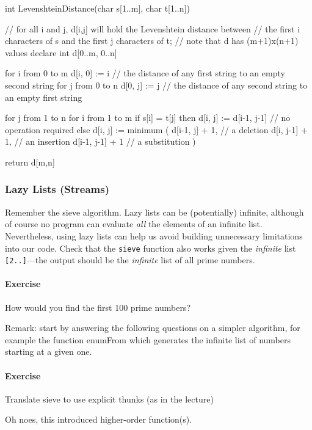 \documentclass{article}
\newcommand{\percents}[1]{\protect \marginpar[l]{\bf [#1]}}
\newcounter{question}
\newcommand{\question}[1]{
  \addtocounter{question}{1}
  \paragraph{Exercise~\arabic{question}  \percents{#1}}
 }
\newenvironment{ex}[1]{\question{#1}}{\vspace{1em}}
\newcommand{\answer}[1]{}
\newcommand{\correctedLastYear}[1]{}
\begin{document}
\begin{cplus}
int LevenshteinDistance(char s[1..m], char t[1..n])
{
  // for all i and j, d[i,j] will hold the Levenshtein distance between
  // the first i characters of s and the first j characters of t;
  // note that d has (m+1)x(n+1) values
  declare int d[0..m, 0..n]

  for i from 0 to m
    d[i, 0] := i // the distance of any first string to an empty second string
  for j from 0 to n
    d[0, j] := j // the distance of any second string to an empty first string

  for j from 1 to n
  {
    for i from 1 to m
    {
      if s[i] = t[j] then
        d[i, j] := d[i-1, j-1]       // no operation required
      else
        d[i, j] := minimum
                   (
                     d[i-1, j] + 1,  // a deletion
                     d[i, j-1] + 1,  // an insertion
                     d[i-1, j-1] + 1 // a substitution
                   )
    }
  }

  return d[m,n]
}
\end{cplus}

\answer{
See Diff.hs
}

\subsubsection{Lazy Lists (Streams)}

Remember the sieve algorithm. Lazy lists can be (potentially)
infinite, although of course no program can evaluate {\em all} the
elements of an infinite list. Nevertheless, using lazy lists can help
us avoid building unnecessary limitations into our code.  Check that
the \verb!sieve! function also works given the {\em infinite} list
\verb![2..]!---the output should be the {\em infinite} list of all
prime numbers.


\begin{ex}{*\correctedLastYear5}
How would you find the first 100 prime numbers?
\end{ex}

Remark: start by answering the following questions on a simpler
algorithm, for example the function \textsf{enumFrom} which generates
the infinite list of numbers starting at a given one.

\begin{ex}{*\correctedLastYear5} Translate sieve to use explicit thunks (as in the lecture)
\end{ex}

Oh noes, this introduced higher-order function(s).
\end{document}

